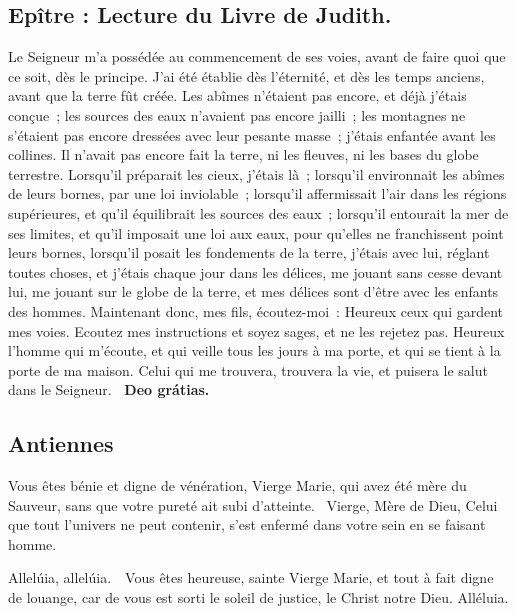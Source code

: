 \begin{multicols}{2}
\subsection*{Epître : Lecture du Livre de Judith.}
Le Seigneur m’a possédée au commencement de ses voies, avant de faire quoi que ce soit, dès le principe. J’ai été établie dès l’éternité, et dès les temps anciens, avant que la terre fût créée. Les abîmes n’étaient pas encore, et déjà j’étais conçue ; les sources des eaux n’avaient pas encore jailli ; les montagnes ne s’étaient pas encore dressées avec leur pesante masse ; j’étais enfantée avant les collines. Il n’avait pas encore fait la terre, ni les fleuves, ni les bases du globe terrestre. Lorsqu’il préparait les cieux, j’étais là ; lorsqu’il environnait les abîmes de leurs bornes, par une loi inviolable ; lorsqu’il affermissait l’air dans les régions supérieures, et qu’il équilibrait les sources des eaux ; lorsqu’il entourait la mer de ses limites, et qu’il imposait une loi aux eaux, pour qu’elles ne franchissent point leurs bornes, lorsqu’il posait les fondements de la terre, j’étais avec lui, réglant toutes choses, et j’étais chaque jour dans les délices, me jouant sans cesse devant lui, me jouant sur le globe de la terre, et mes délices sont d’être avec les enfants des hommes. Maintenant donc, mes fils, écoutez-moi : Heureux ceux qui gardent mes voies. Ecoutez mes instructions et soyez sages, et ne les rejetez pas. Heureux l’homme qui m’écoute, et qui veille tous les jours à ma porte, et qui se tient à la porte de ma maison. Celui qui me trouvera, trouvera la vie, et puisera le salut dans le Seigneur.
\textbf{\rb\ Deo grátias.}

\subsection*{Antiennes}
Vous êtes bénie et digne de vénération, Vierge Marie, qui avez été mère du Sauveur, sans que votre pureté ait subi d’atteinte.
\vb Vierge, Mère de Dieu, Celui que tout l’univers ne peut contenir, s’est enfermé dans votre sein en se faisant homme.


Allelúia, allelúia. \vb\ Vous êtes heureuse, sainte Vierge Marie, et tout à fait digne de louange, car de vous est sorti le soleil de justice, le Christ notre Dieu. Alléluia.


\end{multicols}
